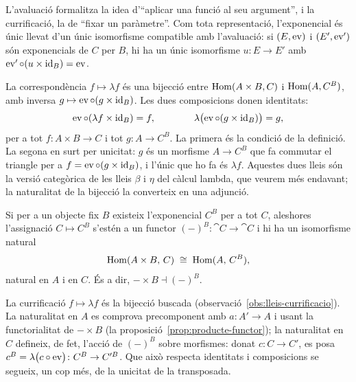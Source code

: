 L'avaluació formalitza la idea d'\enquote{aplicar una funció al seu argument}, i la currificació, la de \enquote{fixar un paràmetre}. Com tota representació, l'exponencial és únic llevat d'un únic isomorfisme compatible amb l'avaluació: si $(E,\operatorname{ev})$ i $(E',\operatorname{ev}')$ són exponencials de $C$ per $B$, hi ha un únic isomorfisme $u\colon E\to E'$ amb $\operatorname{ev}'\circ(u\times\operatorname{id}_B)=\operatorname{ev}$.

\begin{observacio}\label{obs:lleis-currificacio}
La correspondència $f\mapsto\lambda f$ és una bijecció entre $\operatorname{Hom}(A\times B,C)$ i $\operatorname{Hom}(A,C^B)$, amb inversa $g\mapsto\operatorname{ev}\circ(g\times\operatorname{id}_B)$. Les dues composicions donen identitats:
\[
\operatorname{ev}\circ(\lambda f\times\operatorname{id}_B)=f,
\qquad\qquad
\lambda\bigl(\operatorname{ev}\circ(g\times\operatorname{id}_B)\bigr)=g,
\]
per a tot $f\colon A\times B\to C$ i tot $g\colon A\to C^B$. La primera és la condició de la definició. La segona en surt per unicitat: $g$ és un morfisme $A\to C^B$ que fa commutar el triangle per a $f=\operatorname{ev}\circ(g\times\operatorname{id}_B)$, i l'únic que ho fa és $\lambda f$. Aquestes dues lleis són la versió categòrica de les lleis $\beta$ i $\eta$ del càlcul lambda, que veurem més endavant; la naturalitat de la bijecció la converteix en una adjunció.
\end{observacio}

\begin{proposicio}
\label{prop:adjuncio-exp}
Si per a un objecte fix $B$ existeix l'exponencial $C^{B}$ per a tot $C$, aleshores l'assignació $C\mapsto C^{B}$ s'estén a un functor $(-)^{B}\colon\cat{C}\to\cat{C}$ i hi ha un isomorfisme natural
\[
\operatorname{Hom}(A\times B,\,C)\;\cong\;\operatorname{Hom}(A,\,C^{B}),
\]
natural en $A$ i en $C$. És a dir, $-\times B\dashv(-)^{B}$.
\end{proposicio}

\begin{prova}
La currificació $f\mapsto\lambda f$ és la bijecció buscada (observació~\ref{obs:lleis-currificacio}). La naturalitat en $A$ es comprova precomponent amb $a\colon A'\to A$ i usant la functorialitat de $-\times B$ (la proposició~\ref{prop:producte-functor}); la naturalitat en $C$ defineix, de fet, l'acció de $(-)^{B}$ sobre morfismes: donat $c\colon C\to C'$, es posa $c^{B}=\lambda\bigl(c\circ\operatorname{ev}\bigr)\colon C^{B}\to C'^{B}$. Que això respecta identitats i composicions se segueix, un cop més, de la unicitat de la transposada.
\end{prova}

